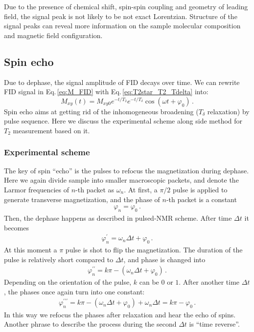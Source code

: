 Due to the presence of chemical shift, spin-spin coupling and geometry of leading field, the signal peak is not likely to be not exact Lorentzian. Structure of the signal peaks can reveal more information on the sample molecular composition and magnetic field configuration. 


\subsection{Spin echo}


Due to dephase, the signal amplitude of FID decays over time. We can rewrite FID signal in Eq.\,\eqref{eq:M_FID} with Eq.\,\eqref{eq:T2star_T2_Tdelta} into:
\begin{equation}
    M_{xy}(t) =  M_{xy0} e^{-t/T_2} e^{-t/T_{\delta}} \cos (\omega t + \varphi_0)\,. \label{eq:M_FID_T2_Tdelta}
\end{equation}
Spin echo aims at getting rid of the inhomogeneous broadening ($T_{\delta}$ relaxation) by pulse sequence. Here we discuss the experimental scheme along side method for $T_2$ measurement based on it. 

\subsubsection{Experimental scheme}

The key of spin ``echo'' is the pulses to refocus the magnetization during dephase. Here we again divide sample into smaller macroscopic packets, and denote the Larmor frequencies of $n$-th packet as $\omega_n$. At first, a $\pi/2$ pulse is applied to generate transverse magnetization, and the phase of $n$-th packet is a constant
\begin{align}
    \varphi_n = \varphi_{0}\,.
\end{align}
Then, the dephase happens as described in pulsed-NMR scheme. After time $\Delta t$ it becomes
\begin{align}
    \varphi_n^{\prime} = \omega_n \Delta t + \varphi_{0}\,.
\end{align}
At this moment a $\pi$ pulse is shot to flip the magnetization. The duration of the pulse is relatively short compared to $\Delta t$, and phase is changed into
\begin{align}
    \varphi_n^{\prime \prime} = k \pi - (\omega_n \Delta t + \varphi_{0})\,.
\end{align}
Depending on the orientation of the pulse, $k$ can be $0$ or $1$. 
After another time $\Delta t$, the phases once again turn into one constant:
\begin{align}
    \varphi_n^{\prime \prime \prime} = k \pi - (\omega_n \Delta t + \varphi_{0}) + \omega_n \Delta t = k \pi - \varphi_{0} \,.
\end{align}
In this way we refocus the phases after relaxation and hear the echo of spins. Another phrase to describe the process during the second $\Delta t$ is ``time reverse''. 

